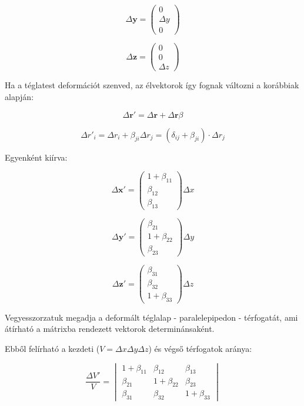 \documentclass[a4paper, 12pt]{article}
\begin{document}
$$\Delta\mathbf{y}= \left( \begin{array}{c} 0\\ \Delta y\\0\end{array}\right)$$

$$\Delta\mathbf{z}= \left( \begin{array}{c} 0\\0\\\Delta z\end{array}\right)$$

Ha a téglatest deformációt szenved, az élvektorok így fognak változni a korábbiak alapján:

$$\Delta\mathbf{r'}=\Delta\mathbf{r}+\Delta \mathbf{r} \beta$$

$$\Delta r'_i=\Delta r_i+\beta_{ji}\Delta r_j=(\delta_{ij}+\beta_{ji})\cdot \Delta r_j$$

Egyenként kiírva:

$$\Delta\mathbf{x'}= \left( \begin{array}{c} 1+\beta_{11}\\\beta_{12}\\ \beta_{13}\end{array}\right)\Delta x$$

$$\Delta\mathbf{y'}= \left( \begin{array}{c} \beta_{21}\\1+\beta_{22}\\ \beta_{23}\end{array}\right)\Delta y$$

$$\Delta\mathbf{z'}= \left( \begin{array}{c} \beta_{31}\\\beta_{32}\\ 1+\beta_{33}\end{array}\right)\Delta z$$

Vegyesszorzatuk megadja a deformált téglalap - paralelepipedon - térfogatát, ami átírható a mátrixba rendezett vektorok determinánsaként. 

Ebből felírható a kezdeti ($V=\Delta x\Delta y\Delta z$) és végső térfogatok aránya:

 $$\frac{\Delta V'}{V}=\begin{vmatrix}
1+\beta_{11} & \beta_{12} & \beta_{13} \\ 
\beta_{21} & 1+\beta_{22} & \beta_{23}\\ 
\beta_{31} & \beta_{32} & 1+\beta_{33} 
\end{vmatrix}$$
\end{document}
